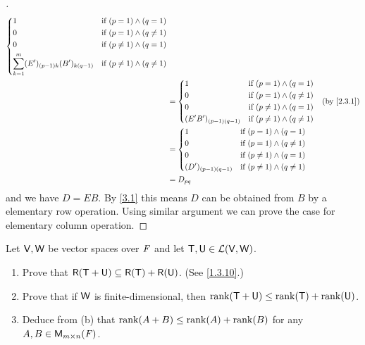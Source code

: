 \begin{proof}[]
\begin{align*}
\begin{dcases}
			     1                                                & \text{if } (p = 1) \land (q = 1)       \\
			     0                                                & \text{if } (p = 1) \land (q \neq 1)    \\
			     0                                                & \text{if } (p \neq 1) \land (q = 1)    \\
			     \sum_{k = 1}^m (E')_{(p - 1) k} (B')_{k (q - 1)} & \text{if } (p \neq 1) \land (q \neq 1)
		     \end{dcases}                        \\
		 & = \begin{dcases}
			     1                         & \text{if } (p = 1) \land (q = 1)       \\
			     0                         & \text{if } (p = 1) \land (q \neq 1)    \\
			     0                         & \text{if } (p \neq 1) \land (q = 1)    \\
			     (E' B')_{(p - 1) (q - 1)} & \text{if } (p \neq 1) \land (q \neq 1)
		     \end{dcases}                              &  & \by{2.3.1}                                               \\
		 & = \begin{dcases}
			     1                      & \text{if } (p = 1) \land (q = 1)       \\
			     0                      & \text{if } (p = 1) \land (q \neq 1)    \\
			     0                      & \text{if } (p \neq 1) \land (q = 1)    \\
			     (D')_{(p - 1) (q - 1)} & \text{if } (p \neq 1) \land (q \neq 1)
		     \end{dcases}                                                  \\
		 & = D_{p q}
	\end{align*}
	and we have \(D = EB\).
	By \cref{3.1} this means \(D\) can be obtained from \(B\) by a elementary row operation.
	Using similar argument we can prove the case for elementary column operation.
\end{proof}

\setcounter{ex}{13}
\begin{ex}\label{ex:3.2.14}
	Let \(\mathsf{V}, \mathsf{W}\) be vector spaces over \(\mathit{F}\) and let \(\mathsf{T}, \mathsf{U} \in \mathcal{L}(\mathsf{V}, \mathsf{W})\).
	\begin{enumerate}
		\item Prove that \(\rg{\T + \U} \subseteq \rg{\T} + \rg{\U}\).
		      (See \cref{1.3.10}.)
		\item Prove that if \(\mathsf{W}\) is finite-dimensional, then \(\rk{\T + \U} \leq \rk{\T} + \rk{\U}\).
		\item Deduce from (b) that \(\rk{A + B} \leq \rk{A} + \rk{B}\) for any \(A, B \in \MS\).
	\end{enumerate}
\end{ex}

